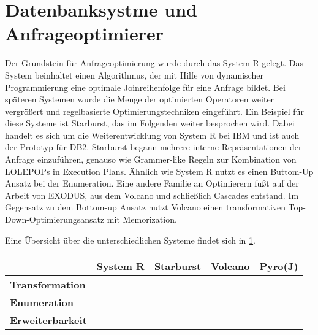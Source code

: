 








\section{Datenbanksystme und Anfrageoptimierer}

Der Grundstein für Anfrageoptimierung wurde durch das System R gelegt. Das System beinhaltet einen Algorithmus, der mit Hilfe von dynamischer Programmierung eine optimale Joinreihenfolge für eine Anfrage bildet. Bei späteren Systemen  wurde die Menge der optimierten Operatoren weiter vergrößert und regelbasierte Optimierungstechniken eingeführt. Ein Beispiel für diese Systeme ist Starburst, das im Folgenden weiter besprochen wird. Dabei handelt es sich um die Weiterentwicklung von System R bei IBM und ist  auch der Prototyp für DB2. Starburst begann mehrere interne Repräsentationen der Anfrage einzuführen, genauso wie Grammer-like Regeln zur Kombination von LOLEPOPs in Execution Plans. Ähnlich wie System R nutzt es einen Buttom-Up Ansatz bei der Enumeration. Eine andere Familie an Optimierern fußt auf der Arbeit von  EXODUS, aus dem Volcano und schließlich Cascades entstand. Im Gegensatz zu dem Bottom-up Ansatz nutzt Volcano einen transformativen Top-Down-Optimierungsansatz mit Memorization.




Eine Übersicht über die unterschiedlichen Systeme findet sich in \ref{DatabasesOverview}.

\begin{table}[h]
\begin{tabular}{|l|l|l|l|l|}
\hline
{\bf }                & {\bf System R} & {\bf Starburst} & {\bf Volcano} & {\bf Pyro(J)} \\ \hline
{\bf Transformation}  &                &                 &               &               \\ \hline
{\bf Enumeration}     &                &                 &               &               \\ \hline
{\bf Erweiterbarkeit} &                &                 &               &               \\ \hline
\end{tabular}
\label{DatabasesOverview}
\end{table}








